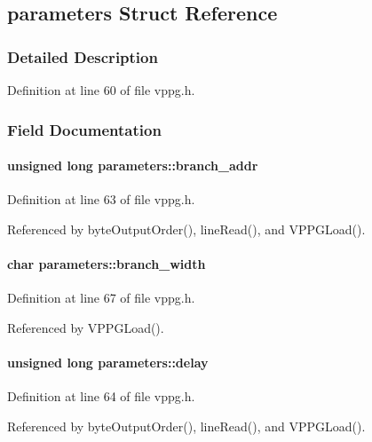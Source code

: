 \subsection{parameters Struct Reference}
\label{structparameters}


\subsubsection{Detailed Description}


Definition at line 60 of file vppg.h.

\subsubsection{Field Documentation}
\paragraph[{branch\_\-addr}]{\setlength{\rightskip}{0pt plus 5cm}unsigned long {\bf parameters::branch\_\-addr}}\hfill\label{structparameters_af5e82b870057b4be79a9d5b1517d6192}


Definition at line 63 of file vppg.h.

Referenced by byteOutputOrder(), lineRead(), and VPPGLoad().
\paragraph[{branch\_\-width}]{\setlength{\rightskip}{0pt plus 5cm}char {\bf parameters::branch\_\-width}}\hfill\label{structparameters_adac4a514be1019ece49f2aa04fc3b3d2}


Definition at line 67 of file vppg.h.

Referenced by VPPGLoad().
\paragraph[{delay}]{\setlength{\rightskip}{0pt plus 5cm}unsigned long {\bf parameters::delay}}\hfill\label{structparameters_a96dc804b7531e1ea0f9d644faffa5c2c}


Definition at line 64 of file vppg.h.

Referenced by byteOutputOrder(), lineRead(), and VPPGLoad().
